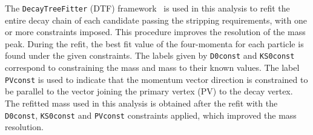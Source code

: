 
The {\tt DecayTreeFitter} (DTF) framework~\cite{Hulsbergen:2005pu} is used in this analysis to refit the entire decay chain of each \Bm candidate passing the stripping requirements, with one or more constraints imposed. This procedure improves the resolution of the \Bm mass peak. During the refit, the best fit value of the four-momenta for each particle is found under the given constraints. The labels given by {\tt D0const} and {\tt KS0const} correspond to constraining the \Dz mass and \KS mass to their known values. The label {\tt PVconst} is used to indicate that the \Bm momentum vector direction is constrained to be parallel to the vector joining the primary vertex (PV) to the \Bm decay vertex. The refitted \Bm mass used in this analysis is obtained after the refit with the {\tt D0const}, {\tt KS0const} and {\tt PVconst} constraints applied, which improved the \Bm mass resolution.

